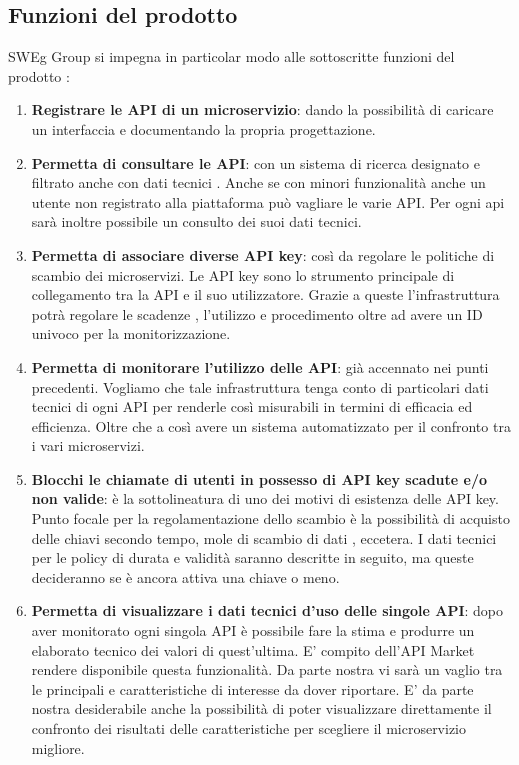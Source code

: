 \documentclass[12pt,a4paper,titlepage]{article}
\begin{document}
\subsection{Funzioni del prodotto}
SWEg Group si impegna in particolar modo alle sottoscritte funzioni del prodotto :
\begin{enumerate}
\item \textbf{Registrare le API di un microservizio}:	dando la possibilità di caricare un interfaccia e documentando la propria progettazione.
\item \textbf{Permetta di consultare le API}:	con un sistema di ricerca designato e filtrato anche con dati tecnici . Anche se con minori funzionalità anche un utente non registrato alla piattaforma può vagliare le varie API. Per ogni api sarà inoltre possibile un consulto dei suoi dati tecnici.
\item \textbf{Permetta di associare diverse API key}: così da regolare le politiche di scambio dei microservizi. Le API key sono lo strumento principale di collegamento tra la API e il suo utilizzatore. Grazie a queste l'infrastruttura potrà regolare le scadenze , l'utilizzo e procedimento oltre ad avere un ID univoco per la monitorizzazione. 
\item \textbf{Permetta di monitorare l'utilizzo delle API}:	già accennato nei punti precedenti. Vogliamo che tale infrastruttura tenga conto di particolari dati tecnici di ogni API per renderle così misurabili in termini di efficacia ed efficienza. Oltre che a così avere un sistema automatizzato per il confronto tra i vari microservizi.
\item \textbf{Blocchi le chiamate di utenti in possesso di API key scadute e/o non valide}:	è la sottolineatura di uno dei motivi di esistenza delle API key. Punto focale per la regolamentazione dello scambio è la possibilità di acquisto delle chiavi secondo tempo, mole di scambio di dati , eccetera. I dati tecnici per le policy di durata e validità saranno descritte in seguito, ma queste decideranno se è ancora attiva una chiave o meno.
\item \textbf{Permetta di visualizzare i dati tecnici d'uso delle singole API}:	dopo aver monitorato ogni singola API è possibile fare la stima e produrre un elaborato tecnico dei valori di quest'ultima. E' compito dell'API Market rendere disponibile questa funzionalità. Da parte nostra vi sarà un vaglio tra le principali e caratteristiche di interesse da dover riportare. E' da parte nostra desiderabile anche la possibilità di poter visualizzare direttamente il confronto dei risultati delle caratteristiche per scegliere il microservizio migliore.

\end{enumerate}
\end{document}
